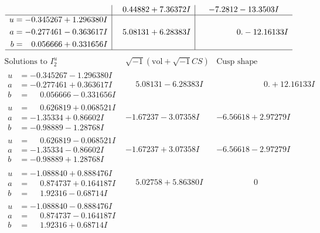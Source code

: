 \documentclass[1p]{elsarticle_modified}
\theoremstyle{definition}
\newcommand{\I}{\sqrt{-1}}
\begin{document}
$$\begin{array}{c|c|c}
 & \phantom{-}0.44882 + 7.36372 I & -7.2812 - 13.3503 I \\ \hline\begin{aligned}
u &= -0.345267 + 1.296380 I \\
a &= -0.277461 - 0.363617 I \\
b &= \phantom{-}0.056666 + 0.331656 I\end{aligned}
 & \phantom{-}5.08131 + 6.28383 I & \phantom{-0.000000 } 0. - 12.16133 I\\
 \hline 
 \end{array}$$\newpage$$\begin{array}{c|c|c}  
\text{Solutions to }I^u_{2}& \I (\text{vol} + \sqrt{-1}CS) & \text{Cusp shape}\\
 \hline 
\begin{aligned}
u &= -0.345267 - 1.296380 I \\
a &= -0.277461 + 0.363617 I \\
b &= \phantom{-}0.056666 - 0.331656 I\end{aligned}
 & \phantom{-}5.08131 - 6.28383 I & \phantom{-0.000000 -}0. + 12.16133 I \\ \hline\begin{aligned}
u &= \phantom{-}0.626819 + 0.068521 I \\
a &= -1.35334 + 0.86602 I \\
b &= -0.98889 - 1.28768 I\end{aligned}
 & -1.67237 - 3.07358 I & -6.56618 + 2.97279 I \\ \hline\begin{aligned}
u &= \phantom{-}0.626819 - 0.068521 I \\
a &= -1.35334 - 0.86602 I \\
b &= -0.98889 + 1.28768 I\end{aligned}
 & -1.67237 + 3.07358 I & -6.56618 - 2.97279 I \\ \hline\begin{aligned}
u &= -1.088840 + 0.888476 I \\
a &= \phantom{-}0.874737 + 0.164187 I \\
b &= \phantom{-}1.92316 - 0.68714 I\end{aligned}
 & \phantom{-}5.02758 + 5.86380 I & \phantom{-0.000000 } 0 \\ \hline\begin{aligned}
u &= -1.088840 - 0.888476 I \\
a &= \phantom{-}0.874737 - 0.164187 I \\
b &= \phantom{-}1.92316 + 0.68714 I\end{aligned}

\end{array}$$
\end{document}
